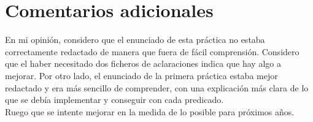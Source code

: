 \documentclass[12pt, a4paper, spanish]{article}
\begin{document}
\begin{enumerate}
\end{enumerate}

\newpage
\section{Comentarios adicionales}

En mi opinión, considero que el enunciado de esta práctica no estaba correctamente redactado de manera que fuera de fácil comprensión. Considero que el haber necesitado dos ficheros de aclaraciones indica que hay algo a mejorar. Por otro lado, el enunciado de la primera práctica estaba mejor redactado y era más sencillo de comprender, con una explicación más clara de lo que se debía implementar y conseguir con cada predicado.\\

Ruego que se intente mejorar en la medida de lo posible para próximos años.
\end{document}
